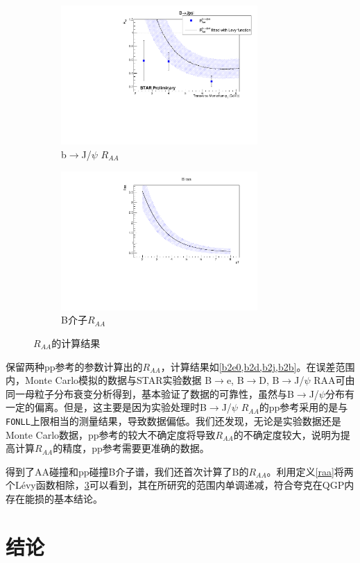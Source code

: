 \documentclass[12pt, a4paper]{ctexart}
\begin{document}
\begin{figure}[h]
	\begin{subfigure}[h]{0.5\textwidth}\centering
	\includegraphics[width=7.5cm]{figures/B2Jpsi.pdf}
	\caption{b$\to$J/$\psi$ $R_{AA}$}
	\label{b2j}
\end{subfigure}
\begin{subfigure}[h]{0.5\textwidth}\centering
	\includegraphics[width=7.5cm]{figures/B.pdf}
	\caption{B介子$R_{AA}$}
	\label{b2b}
\end{subfigure}
\caption{$R_{AA}$的计算结果}
\end{figure}
保留两种pp参考的参数计算出的$R_{AA}$，计算结果如\cref{b2e0,b2d,b2j,b2b}。在误差范围内，Monte Carlo模拟的数据与STAR实验数据 B$\to$e, B$\to$D, B$\to$J/$\psi$ RAA可由同一母粒子分布衰变分析得到，基本验证了数据的可靠性，虽然与B$\to$J/$\psi$分布有一定的偏离。但是，这主要是因为实验处理时B$\to$J/$\psi$ $R_{AA}$的pp参考采用的是与\texttt{FONLL}上限相当的测量结果，导致数据偏低。我们还发现，无论是实验数据还是Monte Carlo数据，pp参考的较大不确定度将导致$R_{AA}$的不确定度较大，说明为提高计算$R_{AA}$的精度，pp参考需要更准确的数据。\par
得到了AA碰撞和pp碰撞B介子谱，我们还首次计算了B的$R_{AA}$。利用定义\cref{raa}将两个L\'evy函数相除，\cref{b2b}可以看到，其在所研究的范围内单调递减，符合夸克在QGP内存在能损的基本结论。


\newpage
\section{结论} %
\label{sec:结论}
\end{document}
